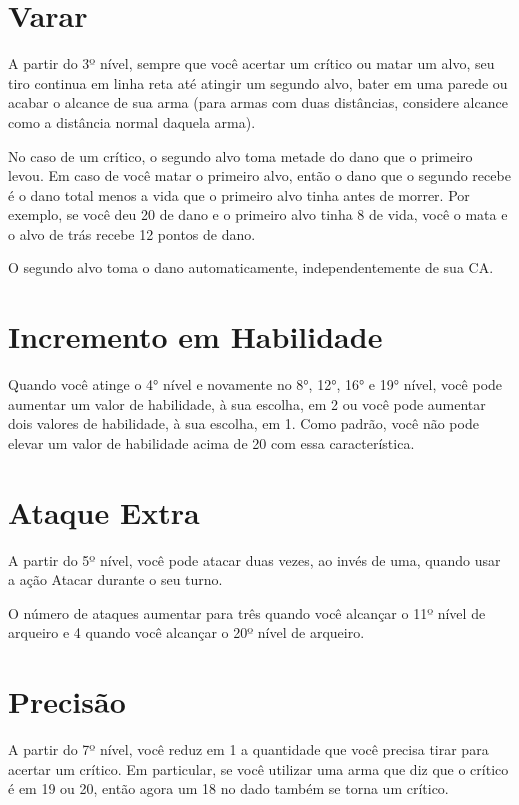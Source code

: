 \documentclass{RPG_Adventure}[2021/10/20]
\begin{document}
\begin{multicols}{2}
\section*{Varar}%

A partir do 3º nível, sempre que você acertar um crítico ou matar um alvo, seu
tiro continua em linha reta até atingir um segundo alvo, bater em uma parede ou
acabar o alcance de sua arma (para armas com duas distâncias, considere alcance
como a distância normal daquela arma).

No caso de um crítico, o segundo alvo toma metade do dano que o primeiro levou.
Em caso de você matar o primeiro alvo, então o dano que o segundo recebe é o
dano total menos a vida que o primeiro alvo tinha antes de morrer. Por exemplo,
se você deu 20 de dano e o primeiro alvo tinha 8 de vida, você o mata e o alvo
de trás recebe 12 pontos de dano.

O segundo alvo toma o dano automaticamente, independentemente de sua CA.

\section*{Incremento em Habilidade}%

Quando você atinge o 4° nível e novamente no 8°, 12°, 16° e 19° nível, você pode
aumentar um valor de habilidade, à sua escolha, em 2 ou você pode aumentar dois
valores de habilidade, à sua escolha, em 1. Como padrão, você não pode elevar um
valor de habilidade acima de 20 com essa característica.

\section*{Ataque Extra}%

A partir do 5º nível, você pode atacar duas vezes, ao invés de uma, quando usar
a ação Atacar durante o seu turno.

O número de ataques aumentar para três quando você alcançar o 11º nível de
arqueiro e 4 quando você alcançar o 20º nível de arqueiro.


\section*{Precisão}%

A partir do 7º nível, você reduz em 1 a quantidade que você precisa tirar para
acertar um crítico. Em particular, se você utilizar uma arma que diz que o
crítico é em 19 ou 20, então agora um 18 no dado também se torna um crítico.


\end{multicols}
\end{document}
